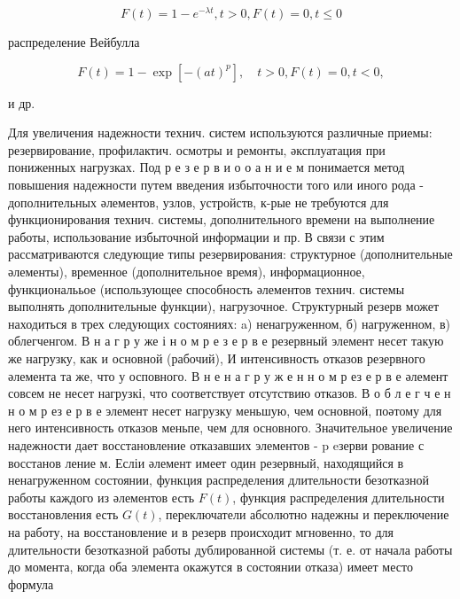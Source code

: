 \documentclass[10pt]{article}
\begin{document}
\[

F(t)=1-e^{-\lambda t}, t>0, F(t)=0, t \leqslant 0

\]



распределение Вейбулла



\[

F(t)=1-\exp \left[-(a t)^{p}\right], \quad t>0, F(t)=0, t<0,

\]



и др.



Для увеличения надежности технич. систем используются различные приемы: резервирование, профилактич. осмотры и ремонты, әксплуатация при пониженных нагрузках. Под р е з е р в и о о а н и е м понимается метод повышения надежности путем введения избыточности того или иного рода - дополнительных әлементов, узлов, устройств, к-рые не требуются для функционирования технич. системы, дополнительного времени на выполнение работы, использование избыточной информации и пр. В связи с этим рассматриваются следующие типы резервирования: структурное (дополнительные әлементы), временное (дополнительное время), информационное, функциональьое (использующее способность әлементов технич. системы выполнять дополнительные функции), нагрузочное. Структурный резерв может находиться в трех следующих состояниях: a) ненагруженном, б) нагруженном, в) облегченгом. В н а г р у же і н о м р е з е р в е резервный элемент несет такую же нагрузку, как и основной (рабочий), И интенсивность отказов резервного әлемента та же, что у осповного. В н е н а г р у ж е н н о м р ез е р в е әлемент совсем не несет нагрузкі, что соответствует отсутствию отказов. В о б л е г ч е н н о м р ез е р в е элемент несет нагрузку меньшую, чем основной, поәтому для него интенсивность отказов меньпе, чем для основного. Значительное увеличение надежности дает восстановление отказавших элементов - p eзерви рование с восстанов ление м. Есліи әлемент имеет один резервный, находящийся в ненагруженном состоянии, функция распределения длительности безотказной работы каждого из әлементов есть $F(t)$, функция распределения длительности восстановления есть $G(t)$, переключатели абсолютно надежны и переключение на работу, на восстановление и в резерв происходит мгновенно, то для длительности безотказной работы дублированной системы (т. е. от начала работы до момента, когда оба элемента окажутся в состоянии отказа) имеет место формула
\end{document}
